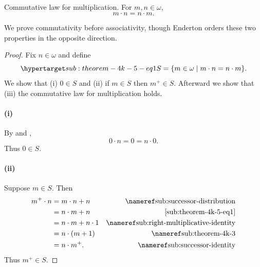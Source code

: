 \documentclass{report}
\begin{document}
\subsection{}

\begin{theorem}[4K-5]

  Commutative law for multiplication.
  For $m, n \in \omega$, $$m \cdot n = n \cdot m.$$

\end{theorem}

\begin{note}
  We prove commutativity before associativity, though Enderton orders these
  two properties in the opposite direction.
\end{note}

\begin{proof}


  Fix $n \in \omega$ and define
    \begin{equation}
      \hyperlabel{sub:theorem-4k-5-eq1}
      S = \{m \in \omega \mid m \cdot n = n \cdot m\}.
    \end{equation}
  We show that (i) $0 \in S$ and (ii) if $m \in S$ then $m^+ \in S$.
  Afterward we show that (iii) the commutative law for multiplication holds.

  \paragraph{(i)}%

    By  and ,
      $$0 \cdot n = 0 = n \cdot 0.$$
    Thus $0 \in S$.

  \paragraph{(ii)}%

    Suppose $m \in S$.
    Then
      \begin{align*}
        m^+ \cdot n
          & = m \cdot n + n & \textref{sub:successor-distribution} \\
          & = n \cdot m + n & \eqref{sub:theorem-4k-5-eq1} \\
          & = n \cdot m + n \cdot 1
            & \textref{sub:right-multiplicative-identity} \\
          & = n \cdot (m + 1) & \textref{sub:theorem-4k-3} \\
          & = n \cdot m^+. & \textref{sub:successor-identity}
      \end{align*}
    Thus $m^+ \in S$.


\end{proof}
\end{document}
